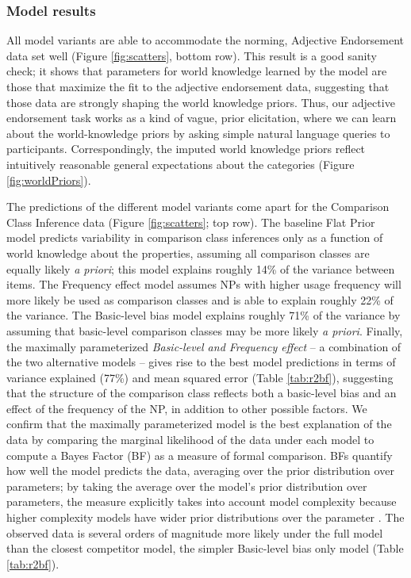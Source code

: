 \documentclass[doc, floatsintext]{apa6}
\begin{document}
\subsubsection{Model results}%
All model variants are able to accommodate the norming, Adjective Endorsement data set well (Figure \ref{fig:scatters}, bottom row).
This result is a good sanity check; it shows that parameters for world knowledge learned by the model are those that maximize the fit to the adjective endorsement data, suggesting that those data are strongly shaping the world knowledge priors.
 Thus, our adjective endorsement task works as a kind of vague, prior elicitation, where we can learn about the world-knowledge priors by asking simple natural language queries to participants. 
Correspondingly, the imputed world knowledge priors reflect intuitively reasonable general expectations about the categories (Figure \ref{fig:worldPriors}).

The predictions of the different model variants come apart for the Comparison Class Inference data (Figure \ref{fig:scatters}; top row).
The baseline Flat Prior model predicts variability in comparison class inferences only as a function of world knowledge about the properties, assuming all comparison classes are equally likely \emph{a priori}; this model explains roughly 14\% of the variance between items.
The Frequency effect model assumes NPs with higher usage frequency will more likely be used as comparison classes and is able to explain roughly 22\% of the variance.
The Basic-level bias model explains roughly 71\% of the variance by assuming that basic-level comparison classes may be more likely \emph{a priori}.
Finally, the maximally parameterized \emph{Basic-level and Frequency effect} -- a combination of the two alternative models -- gives rise to the best model predictions in terms of variance explained (77\%) and mean squared error (Table \ref{tab:r2bf}), suggesting that the structure of the comparison class reflects both a basic-level bias and an effect of the frequency of the NP, in addition to other possible factors.
We confirm that the maximally parameterized model is the best explanation of the data by comparing the marginal likelihood of the data under each model to compute a Bayes Factor (BF) as a measure of formal comparison. 
BFs quantify how well the model predicts the data, averaging over the prior distribution over parameters; by taking the average over the model's prior distribution over parameters, the measure explicitly takes into account model complexity because higher complexity models have wider prior distributions over the parameter \cite{lee2014bayesian}.
The observed data is several orders of magnitude more likely under the full model than the closest competitor model, the simpler Basic-level bias only model (Table \ref{tab:r2bf}).
\end{document}

